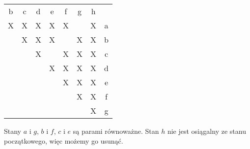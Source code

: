 \documentclass{article}
\begin{document}
    \begin{table}[h!]
        \begin{tabular}{cccccccc}
        b                       & c                      & d                      & e                      & f                      & g                      & h                      &   \\ \cline{1-7}
        \multicolumn{1}{|c|}{X} & \multicolumn{1}{c|}{X} & \multicolumn{1}{c|}{X} & \multicolumn{1}{c|}{X} & \multicolumn{1}{c|}{X} & \multicolumn{1}{c|}{}  & \multicolumn{1}{c|}{X} & a \\ \cline{1-7}
        \multicolumn{1}{c|}{}   & \multicolumn{1}{c|}{X} & \multicolumn{1}{c|}{X} & \multicolumn{1}{c|}{X} & \multicolumn{1}{c|}{}  & \multicolumn{1}{c|}{X} & \multicolumn{1}{c|}{X} & b \\ \cline{2-7}
                                & \multicolumn{1}{c|}{}  & \multicolumn{1}{c|}{X} & \multicolumn{1}{c|}{}  & \multicolumn{1}{c|}{X} & \multicolumn{1}{c|}{X} & \multicolumn{1}{c|}{X} & c \\ \cline{3-7}
                                &                        & \multicolumn{1}{c|}{}  & \multicolumn{1}{c|}{X} & \multicolumn{1}{c|}{X} & \multicolumn{1}{c|}{X} & \multicolumn{1}{c|}{X} & d \\ \cline{4-7}
                                &                        &                        & \multicolumn{1}{c|}{}  & \multicolumn{1}{c|}{X} & \multicolumn{1}{c|}{X} & \multicolumn{1}{c|}{X} & e \\ \cline{5-7}
                                &                        &                        &                        & \multicolumn{1}{c|}{}  & \multicolumn{1}{c|}{X} & \multicolumn{1}{c|}{X} & f \\ \cline{6-7}
                                &                        &                        &                        &                        & \multicolumn{1}{c|}{}  & \multicolumn{1}{c|}{X} & g \\ \cline{7-7}
        \end{tabular}
    \end{table}
    \break
    Stany $a$ i $g$, $b$ i $f$, $c$ i $e$ są parami równoważne.\hfill\break
    Stan $h$ nie jest osiągalny ze stanu początkowego, więc możemy go usunąć.
\end{document}
